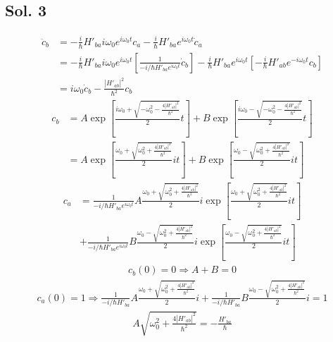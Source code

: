 \subsection*{Sol. 3}
\begin{align*}
    \ddot c_b & =
    -\frac{i}{\hbar}
    H'_{ba}i\omega_0 e^{i\omega_0 t}c_a
    -\frac{i}{\hbar}
    H'_{ba} e^{i\omega_0 t}\dot c_a \\
              & =
    -\frac{i}{\hbar}
    H'_{ba}i\omega_0 e^{i\omega_0 t}
    \left[
        \frac{1}{-i/\hbar H'_{ba}e^{i\omega_0 t}}
        \dot c_b
        \right]
    -\frac{i}{\hbar}
    H'_{ba} e^{i\omega_0 t}
    \left[
        -\frac{i}{\hbar}H'_{ab}e^{-i\omega_0 t}c_b
        \right] \\
              & =
    i\omega_0 \dot c_b
    -\frac{|H'_{ab}|^2}{\hbar^2} c_b
\end{align*}
\begin{align*}
    c_b & = A\exp\left[\frac{i\omega_0 + \sqrt{-\omega_0^2 - \frac{4|H'_{ab}|^2}{\hbar^2}}}{2} t\right]
    + B\exp\left[\frac{i\omega_0 - \sqrt{-\omega_0^2 - \frac{4|H'_{ab}|^2}{\hbar^2}}}{2} t\right] \\
        & =
    A\exp\left[\frac{\omega_0 + \sqrt{\omega_0^2 + \frac{4|H'_{ab}|^2}{\hbar^2}}}{2} it\right]
    + B\exp\left[\frac{\omega_0 - \sqrt{\omega_0^2 + \frac{4|H'_{ab}|^2}{\hbar^2}}}{2} it\right]
\end{align*}
\begin{align*}
    c_a & =
    \frac{1}{-i/\hbar H'_{ba}e^{i\omega_0 t}}A\frac{\omega_0 + \sqrt{\omega_0^2 + \frac{4|H'_{ab}|^2}{\hbar^2}}}{2} i
    \exp\left[\frac{\omega_0 + \sqrt{\omega_0^2 + \frac{4|H'_{ab}|^2}{\hbar^2}}}{2} it\right]
    \\ & + \frac{1}{-i/\hbar H'_{ba}e^{i\omega_0 t}}B
    \frac{\omega_0 - \sqrt{\omega_0^2 + \frac{4|H'_{ab}|^2}{\hbar^2}}}{2} i
    \exp\left[\frac{\omega_0 - \sqrt{\omega_0^2 + \frac{4|H'_{ab}|^2}{\hbar^2}}}{2} it\right]
\end{align*}
\begin{align*}
    c_b(0) = 0 \Rightarrow A+B = 0
\end{align*}
\begin{align*}
    c_a(0) = 1 \Rightarrow
    \frac{1}{-i/\hbar H'_{ba}}A\frac{\omega_0 + \sqrt{\omega_0^2 + \frac{4|H'_{ab}|^2}{\hbar^2}}}{2} i
    +
    \frac{1}{-i/\hbar H'_{ba}}B\frac{\omega_0 - \sqrt{\omega_0^2 + \frac{4|H'_{ab}|^2}{\hbar^2}}}{2} i = 1
\end{align*}
\begin{align*}
    A\sqrt{\omega_0^2 + \frac{4|H'_{ab}|^2}{\hbar^2}}
    = - \frac{H'_{ba}}{\hbar}
\end{align*}

